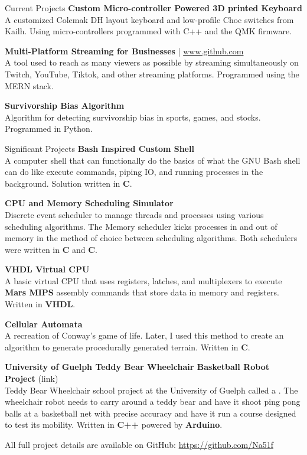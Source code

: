\documentclass{resume}
\begin{document}
    \begin{rSection}{Current Projects}
        \textbf{Custom Micro-controller Powered 3D printed Keyboard}
        \\ A customized Colemak DH layout keyboard and low-profile Choc switches from Kailh. Using micro-controllers programmed with C++ and the QMK firmware.
        
        \textbf{Multi-Platform Streaming for Businesses}  |  \href{Github Repository} \url{www.github.com}
        \\ A tool used to reach as many viewers as possible by streaming simultaneously on Twitch, YouTube, Tiktok, and other streaming platforms.
        Programmed using the MERN stack.

        \textbf{Survivorship Bias Algorithm}
        \\ Algorithm for detecting survivorship bias in sports, games, and stocks. 
        Programmed in Python.
    \end{rSection}
    
    \begin{rSection}{Significant Projects}
        \textbf{Bash Inspired Custom Shell} \\
        A computer shell that can functionally do the basics of what the GNU Bash shell can do like execute commands, piping IO, and running processes in the background. Solution written in \textbf{C}.

        \textbf{CPU and Memory Scheduling Simulator} \\
        Discrete event scheduler to manage threads and processes using various scheduling algorithms. The Memory scheduler kicks processes in and out of memory in the method of choice between scheduling algorithms. Both schedulers were written in \textbf{C} and \textbf{C}.

        \textbf{VHDL Virtual CPU} \\
        A basic virtual CPU that uses registers, latches, and multiplexers to execute \textbf{Mars MIPS} assembly commands that store data in memory and registers. Written in \textbf{VHDL}.

        \textbf{Cellular Automata} \\ 
        A recreation of Conway's game of life. Later, I used this method to create an algorithm to generate procedurally generated terrain. Written in \textbf{C}.
        
        \textbf{University of Guelph Teddy Bear Wheelchair Basketball Robot Project} (link) \\ 
        Teddy Bear Wheelchair school project at the University of Guelph called a . The wheelchair robot needs to carry around a teddy bear and have it shoot ping pong balls at a basketball net with precise accuracy and have it run a course designed to test its mobility. Written in \textbf{C++} powered by \textbf{Arduino}.

        {All full project details are available on GitHub: \url{https://github.com/Na51f}}
    \end{rSection}
\end{document}
